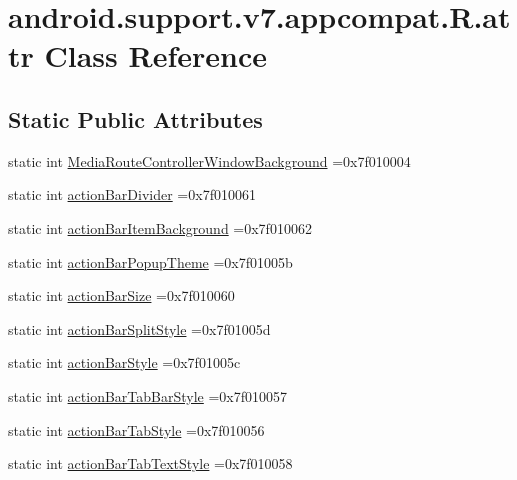 \hypertarget{classandroid_1_1support_1_1v7_1_1appcompat_1_1R_1_1attr}{}\section{android.\+support.\+v7.\+appcompat.\+R.\+attr Class Reference}
\label{classandroid_1_1support_1_1v7_1_1appcompat_1_1R_1_1attr}
\subsection*{Static Public Attributes}
\begin{DoxyCompactItemize}
\item 
static int \hyperlink{classandroid_1_1support_1_1v7_1_1appcompat_1_1R_1_1attr_aaa4c980fb561525b3eee27b28c46120e}{Media\+Route\+Controller\+Window\+Background} =0x7f010004
\item 
static int \hyperlink{classandroid_1_1support_1_1v7_1_1appcompat_1_1R_1_1attr_acffa48b16d0a323e2269b6253d3706b6}{action\+Bar\+Divider} =0x7f010061
\item 
static int \hyperlink{classandroid_1_1support_1_1v7_1_1appcompat_1_1R_1_1attr_a5ebb4ad8ffb85e6e340393c3a255ce33}{action\+Bar\+Item\+Background} =0x7f010062
\item 
static int \hyperlink{classandroid_1_1support_1_1v7_1_1appcompat_1_1R_1_1attr_a2b592c6f7020c21bbbc10b803f74ec6d}{action\+Bar\+Popup\+Theme} =0x7f01005b
\item 
static int \hyperlink{classandroid_1_1support_1_1v7_1_1appcompat_1_1R_1_1attr_ada080c72115e2640eef32a1cb3f07176}{action\+Bar\+Size} =0x7f010060
\item 
static int \hyperlink{classandroid_1_1support_1_1v7_1_1appcompat_1_1R_1_1attr_aaa2ad4da3570284af536385254d4ebaf}{action\+Bar\+Split\+Style} =0x7f01005d
\item 
static int \hyperlink{classandroid_1_1support_1_1v7_1_1appcompat_1_1R_1_1attr_a20d4f2ebf315d126dc70833d98921b1d}{action\+Bar\+Style} =0x7f01005c
\item 
static int \hyperlink{classandroid_1_1support_1_1v7_1_1appcompat_1_1R_1_1attr_a11ff2b39bc8cffba2532abb673a5413a}{action\+Bar\+Tab\+Bar\+Style} =0x7f010057
\item 
static int \hyperlink{classandroid_1_1support_1_1v7_1_1appcompat_1_1R_1_1attr_ac8dabb7ecb7995fda674a5ecc8eca50d}{action\+Bar\+Tab\+Style} =0x7f010056
\item 
static int \hyperlink{classandroid_1_1support_1_1v7_1_1appcompat_1_1R_1_1attr_aba611b517de855c7a18d3a60783bfa3a}{action\+Bar\+Tab\+Text\+Style} =0x7f010058

\end{DoxyCompactItemize}
